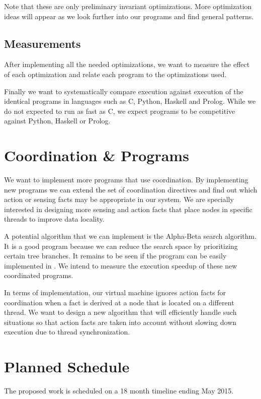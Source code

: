 Note that these are only preliminary invariant optimizations. More optimization ideas will appear
as we look further into our programs and find general patterns.

\subsection{Measurements}

After implementing all the needed optimizations, we want to measure the effect of each optimization
and relate each program to the optimizations used.

Finally we want to systematically compare \lang execution against execution of the identical programs
in languages such as C, Python, Haskell and Prolog. While we do not expected to run as fast as C,
we expect \lang programs to be competitive against Python, Haskell or Prolog.

\section{Coordination \& Programs}

We want to implement more programs that use coordination. By implementing new programs we can
extend the set of coordination directives and find out which action or sensing facts may be
appropriate in our system. We are specially interested in designing more sensing and action
facts that place nodes in specific threads to improve data locality.

A potential algorithm that we can implement is the Alpha-Beta search algorithm. It is a good program
because we can reduce the search space by prioritizing certain tree branches. It remains to be
seen if the program can be easily implemented in \lang.
We intend to measure the execution speedup of these new coordinated programs.

In terms of implementation, our virtual machine ignores action facts for coordination when a fact
is derived at a node that is located on a different thread. We want to design a new algorithm
that will efficiently handle such situations so that action facts are taken into account without
slowing down execution due to thread synchronization.

\section{Planned Schedule}

The proposed work is scheduled on a 18 month timeline ending May 2015.

